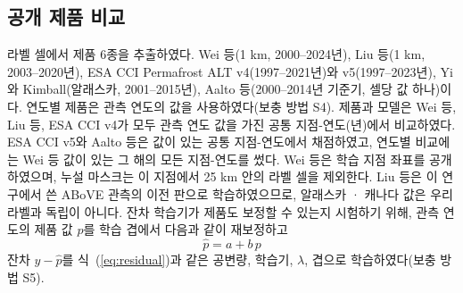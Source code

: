 \subsection{공개 제품 비교}
라벨 셀에서 제품 6종을 추출하였다. Wei 등\cite{Wei2026}(1 km, 2000--2024년), Liu 등\cite{Liu2024}(1 km, 2003--2020년), ESA CCI Permafrost ALT v4(1997--2021년)와 v5(1997--2023년)\cite{Westermann2024,Westermann2025}, Yi와 Kimball\cite{YiKimball2019}(알래스카, 2001--2015년), Aalto 등\cite{Aalto2018}(2000--2014년 기준기, 셀당 값 하나)이다. 연도별 제품은 관측 연도의 값을 사용하였다(보충 방법 S4). 제품과 모델은 Wei 등, Liu 등, ESA CCI v4가 모두 관측 연도 값을 가진 공통 지점-연도(\nyrscc{}년)에서 비교하였다. ESA CCI v5와 Aalto 등은 값이 있는 공통 지점-연도에서 채점하였고, 연도별 비교에는 Wei 등 값이 있는 그 해의 모든 지점-연도를 썼다. Wei 등은 학습 지점 좌표를 공개하였으며, 누설 마스크는 이 지점에서 25 km 안의 라벨 셀을 제외한다. Liu 등은 이 연구에서 쓴 ABoVE 관측의 이전 판으로 학습하였으므로\cite{Liu2024}, 알래스카 · 캐나다 값은 우리 라벨과 독립이 아니다. 잔차 학습기가 제품도 보정할 수 있는지 시험하기 위해, 관측 연도의 제품 값 $p$를 학습 겹에서 다음과 같이 재보정하고
\begin{equation}
\hat{p} = a + b\, p
\label{eq:prod}
\end{equation}
잔차 $y-\hat{p}$를 식~(\ref{eq:residual})과 같은 공변량, 학습기, $\lambda$, 겹으로 학습하였다(보충 방법 S5).

